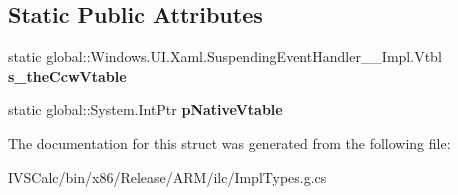 \subsection*{Static Public Attributes}
\begin{DoxyCompactItemize}
\item 
\mbox{\label{struct_windows_1_1_u_i_1_1_xaml_1_1_suspending_event_handler_____impl_1_1_vtbl_a4bfcedc0bcfb44dad98015cd807f2617}} 
static global\+::\+Windows.\+U\+I.\+Xaml.\+Suspending\+Event\+Handler\+\_\+\+\_\+\+Impl.\+Vtbl {\bfseries s\+\_\+the\+Ccw\+Vtable}
\item 
\mbox{\label{struct_windows_1_1_u_i_1_1_xaml_1_1_suspending_event_handler_____impl_1_1_vtbl_a71e8cb365c8fcd43f8331c3a95a83d08}} 
static global\+::\+System.\+Int\+Ptr {\bfseries p\+Native\+Vtable}
\end{DoxyCompactItemize}


The documentation for this struct was generated from the following file\+:\begin{DoxyCompactItemize}
\item 
I\+V\+S\+Calc/bin/x86/\+Release/\+A\+R\+M/ilc/Impl\+Types.\+g.\+cs\end{DoxyCompactItemize}
